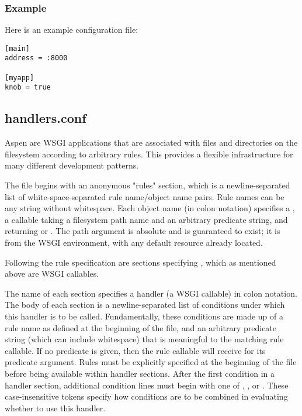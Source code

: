 \subsubsection{Example}

Here is an example  configuration file:

\begin{verbatim}
[main]
address = :8000

[myapp]
knob = true
\end{verbatim}


\subsection{handlers.conf}
\label{handlers-conf}

Aspen  are WSGI applications that are associated with files and
directories on the filesystem according to arbitrary rules. This provides a
flexible infrastructure for many different development patterns.

The  file begins with an anonymous "rules" section,
which is a newline-separated list of white-space-separated rule name/object name
pairs. Rule names can be any string without whitespace. Each object name (in
colon notation) specifies a , a callable taking a filesystem path name
and an arbitrary predicate string, and returning  or .
The path argument is absolute and is guaranteed to exist; it is
 from the WSGI environment, with any default resource
already located.

Following the rule specification are sections specifying , which
as mentioned above are WSGI callables.

The name of each section specifies a handler (a WSGI callable) in colon
notation. The body of each section is a newline-separated list of conditions
under which this handler is to be called. Fundamentally, these conditions are
made up of a rule name as defined at the beginning of the file, and an arbitrary
predicate string (which can include whitespace) that is meaningful to the
matching rule callable. If no predicate is given, then the rule callable will
receive  for its predicate argument. Rules must be explicitly
specified at the beginning of the file before being available within handler
sections. After the first condition in a handler section, additional condition
lines must begin with one of , , or . These
case-insensitive tokens specify how conditions are to be combined in evaluating
whether to use this handler.

